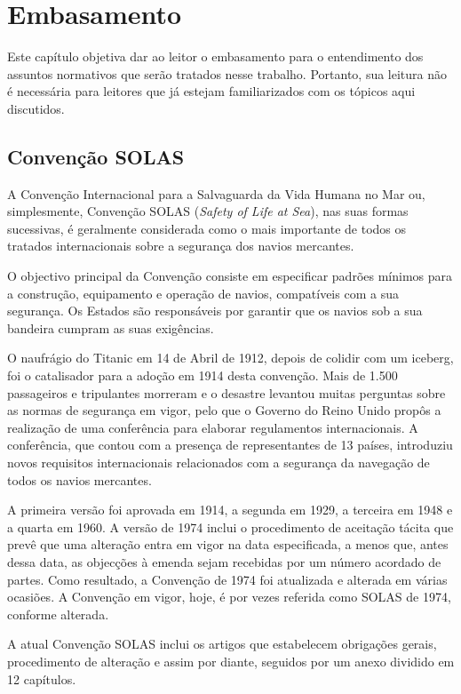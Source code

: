 \documentclass[../main.tex]{subfiles}
\begin{document}
\chapter{Embasamento}
Este capítulo objetiva dar ao leitor o embasamento para o entendimento dos assuntos normativos que serão tratados nesse trabalho. Portanto, sua leitura não é necessária para leitores que já estejam familiarizados com os tópicos aqui discutidos.

\section{Convenção SOLAS} \label{sec:SOLAS_convention}
 A Convenção Internacional para a Salvaguarda da Vida Humana no Mar ou, simplesmente, Convenção SOLAS (\emph{Safety of Life at Sea}), nas suas formas sucessivas, é geralmente considerada como o mais importante de todos os tratados internacionais sobre a segurança dos navios mercantes.
 
 O objectivo principal da Convenção consiste em especificar padrões mínimos para a construção, equipamento e operação de navios, compatíveis com a sua segurança. Os Estados são responsáveis por garantir que os navios sob a sua bandeira cumpram as suas exigências.
 
 O naufrágio do Titanic em 14 de Abril de 1912, depois de colidir com um iceberg, foi o catalisador para a adoção em 1914 desta convenção. Mais de 1.500 passageiros e tripulantes morreram e o desastre levantou muitas perguntas sobre as normas de segurança em vigor, pelo que o Governo do Reino Unido propôs a realização de uma conferência para elaborar regulamentos internacionais. A conferência, que contou com a presença de representantes de 13 países, introduziu novos requisitos internacionais relacionados com a segurança da navegação de todos os navios mercantes.

 A primeira versão foi aprovada em 1914, a segunda em 1929, a terceira em 1948 e a quarta em 1960. A versão de 1974 inclui o procedimento de aceitação tácita que prevê que uma alteração entra em vigor na data especificada, a menos que, antes dessa data, as objecções à emenda sejam recebidas por um número acordado de partes. Como resultado, a Convenção de 1974 foi atualizada e alterada em várias ocasiões. A Convenção em vigor, hoje, é por vezes referida como SOLAS de 1974, conforme alterada.
 
 A atual Convenção SOLAS inclui os artigos que estabelecem obrigações gerais, procedimento de alteração e assim por diante, seguidos por um anexo dividido em 12 capítulos.
 
\end{document}
